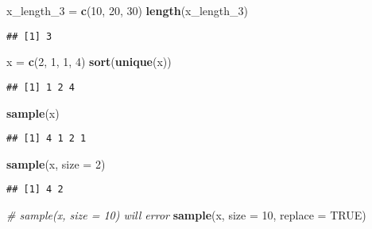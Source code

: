 \documentclass[]{article}
\newenvironment{Shaded}{\begin{snugshade}}{\end{snugshade}}
\newcommand{\CommentTok}[1]{\textcolor[rgb]{0.56,0.35,0.01}{\textit{#1}}}
\newcommand{\DataTypeTok}[1]{\textcolor[rgb]{0.13,0.29,0.53}{#1}}
\newcommand{\DecValTok}[1]{\textcolor[rgb]{0.00,0.00,0.81}{#1}}
\newcommand{\KeywordTok}[1]{\textcolor[rgb]{0.13,0.29,0.53}{\textbf{#1}}}
\newcommand{\NormalTok}[1]{#1}
\newcommand{\OtherTok}[1]{\textcolor[rgb]{0.56,0.35,0.01}{#1}}
\newcommand{\StringTok}[1]{\textcolor[rgb]{0.31,0.60,0.02}{#1}}
\begin{document}
\begin{Shaded}
\begin{Highlighting}[]
\NormalTok{x_length_}\DecValTok{3}\NormalTok{ =}\StringTok{ }\KeywordTok{c}\NormalTok{(}\DecValTok{10}\NormalTok{, }\DecValTok{20}\NormalTok{, }\DecValTok{30}\NormalTok{)}
\KeywordTok{length}\NormalTok{(x_length_}\DecValTok{3}\NormalTok{)}
\end{Highlighting}
\end{Shaded}

\begin{verbatim}
## [1] 3
\end{verbatim}

\begin{Shaded}
\begin{Highlighting}[]
\NormalTok{x =}\StringTok{ }\KeywordTok{c}\NormalTok{(}\DecValTok{2}\NormalTok{, }\DecValTok{1}\NormalTok{, }\DecValTok{1}\NormalTok{, }\DecValTok{4}\NormalTok{)}
\KeywordTok{sort}\NormalTok{(}\KeywordTok{unique}\NormalTok{(x))}
\end{Highlighting}
\end{Shaded}

\begin{verbatim}
## [1] 1 2 4
\end{verbatim}

\begin{Shaded}
\begin{Highlighting}[]
\KeywordTok{sample}\NormalTok{(x)}
\end{Highlighting}
\end{Shaded}

\begin{verbatim}
## [1] 4 1 2 1
\end{verbatim}

\begin{Shaded}
\begin{Highlighting}[]
\KeywordTok{sample}\NormalTok{(x, }\DataTypeTok{size =} \DecValTok{2}\NormalTok{)}
\end{Highlighting}
\end{Shaded}

\begin{verbatim}
## [1] 4 2
\end{verbatim}

\begin{Shaded}
\begin{Highlighting}[]
\CommentTok{# sample(x, size = 10) will error }
\KeywordTok{sample}\NormalTok{(x, }\DataTypeTok{size =} \DecValTok{10}\NormalTok{, }\DataTypeTok{replace =} \OtherTok{TRUE}\NormalTok{)}
\end{Highlighting}
\end{Shaded}
\end{document}
